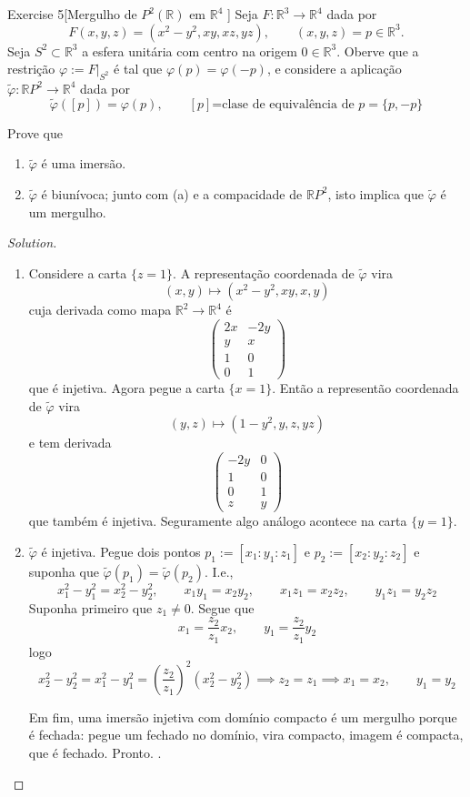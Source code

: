 \begin{thing4}{Exercise 5}[Mergulho de \(P^2(\mathbb{R})\) em \(\mathbb{R}^4\) ]\label{exer:5}\leavevmode
Seja \(F:\mathbb{R}^3 \to \mathbb{R}^4\) dada por
\[F(x,y,z)=(x^2-y^2,xy,xz,yz),\qquad (x,y,z) = p \in \mathbb{R}^3.\]
Seja \(S^2 \subset \mathbb{R}^3\) a esfera unitária com centro na origem \(0 \in \mathbb{R}^3\). Oberve que a restrição \( \varphi:= F|_{S^2}\) é tal que \(\varphi(p)=\varphi(-p)\), e considere a aplicação \(\tilde{\varphi}:\mathbb{R}P^2 \to \mathbb{R}^4\) dada por
\[\tilde{ \varphi}([p])=\varphi(p),\qquad [p]\text{=clase de equivalência de \(p=\{p,-p\}\)} \]

Prove que
\begin{enumerate}[label=(\alph*)]
\item \(\tilde{\varphi}\) é uma imersão.
\item \(\tilde{\varphi}\) é biunívoca; junto com (a) e a compacidade de  \(\mathbb{R}P^2\), isto implica que \(\tilde{ \varphi}\) é um mergulho.
\end{enumerate}
\end{thing4}

\begin{proof}[Solution]\leavevmode
\begin{enumerate}[label=(\alph*)]
\item Considere a carta \(\{z=1\}\). A representação coordenada de \(\tilde{\varphi}\) vira
	\[(x,y) \longmapsto (x^2-y^2,xy,x,y)\]
cuja derivada como mapa \(\mathbb{R}^2 \to \mathbb{R}^4\) é
\[\begin{pmatrix} 2x& -2y\\y&x\\1&0\\0&1 \end{pmatrix} \]
que é injetiva. Agora pegue a carta \(\{x=1\}\). Então a representão coordenada de \(\tilde{ \varphi}\) vira
\[(y,z) \longmapsto (1-y^2,y,z,yz)\]
e tem derivada
\[\begin{pmatrix} -2y&0\\1&0\\0&1\\z&y \end{pmatrix} \]
que também é injetiva. Seguramente algo análogo acontece na carta \(\{y=1\}\).

\item \(\tilde{\varphi}\) é injetiva. Pegue dois pontos \(p_1:=[x_1:y_1:z_1]\) e \(p_2:=[x_2:y_2:z_2]\) e suponha que \(\tilde{\varphi}(p_1)=\tilde{\varphi}(p_2)\). I.e.,
	\[x_1^2-y_1^2=x_2^2-y_2^2,\qquad x_1y_1=x_2y_2,\qquad x_1z_1=x_2z_2, \qquad y_1z_1=y_2z_2\]
	Suponha primeiro que \(z_1 \neq  0\). Segue que
	\[x_1=\frac{z_2}{z_1}x_2, \qquad y_1=\frac{z_2}{z_1}y_2\]
	logo
	\[x_2^2-y_2^2=x_1^2-y_1^2=\left(\frac{z_2}{z_1}\right)^2(x_2^2-y_2^2)\implies z_2=z_1\implies x_1=x_2,\qquad y_1=y_2\]
	

	Em fim, uma imersão injetiva com domínio compacto é um mergulho porque é fechada: pegue um fechado no domínio, vira compacto, imagem é compacta, que é fechado. Pronto.
.
\end{enumerate}
\end{proof}

